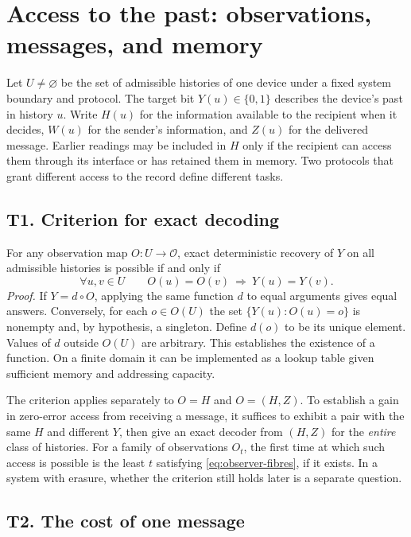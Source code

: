 \section{Access to the past: observations, messages, and memory}
\label{sec:observer-theory}

Let $U\ne\varnothing$ be the set of admissible histories of one device under a fixed system boundary and protocol. The target bit $Y(u)\in\{0,1\}$ describes the device's past in history $u$. Write $H(u)$ for the information available to the recipient when it decides, $W(u)$ for the sender's information, and $Z(u)$ for the delivered message. Earlier readings may be included in $H$ only if the recipient can access them through its interface or has retained them in memory. Two protocols that grant different access to the record define different tasks.

\subsection{T1. Criterion for exact decoding}
\label{thm:observer-t1}

For any observation map $O:U\to\mathcal O$, exact deterministic recovery of $Y$ on all admissible histories is possible if and only if
\begin{equation}
 \forall u,v\in U\qquad O(u)=O(v)\ \Longrightarrow\ Y(u)=Y(v).
 \label{eq:observer-fibres}
\end{equation}
\emph{Proof.} If $Y=d\circ O$, applying the same function $d$ to equal arguments gives equal answers. Conversely, for each $o\in O(U)$ the set $\{Y(u):O(u)=o\}$ is nonempty and, by hypothesis, a singleton. Define $d(o)$ to be its unique element. Values of $d$ outside $O(U)$ are arbitrary. This establishes the existence of a function. On a finite domain it can be implemented as a lookup table given sufficient memory and addressing capacity.

The criterion applies separately to $O=H$ and $O=(H,Z)$. To establish a gain in zero-error access from receiving a message, it suffices to exhibit a pair with the same $H$ and different $Y$, then give an exact decoder from $(H,Z)$ for the \emph{entire} class of histories. For a family of observations $O_t$, the first time at which such access is possible is the least $t$ satisfying \eqref{eq:observer-fibres}, if it exists. In a system with erasure, whether the criterion still holds later is a separate question.

\subsection{T2. The cost of one message}
\label{thm:observer-t2}

